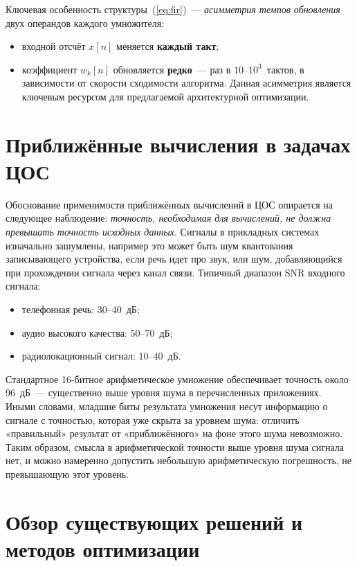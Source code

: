 \documentclass[a4paper, 12pt, oneside]{report}
\begin{document}
Ключевая особенность структуры~(\ref{eq:fir})~--- \textit{асимметрия
темпов обновления} двух операндов каждого умножителя:
\begin{itemize}
  \item входной отсчёт $x[n]$ меняется \textbf{каждый такт};
  \item коэффициент $w_k[n]$ обновляется \textbf{редко}~--- раз в
        $10$--$10^3$~тактов, в зависимости от скорости сходимости
        алгоритма. Данная асимметрия является ключевым ресурсом 
        для предлагаемой архитектурной оптимизации.
\end{itemize}


\section{Приближённые вычисления в задачах ЦОС}

Обоснование применимости приближённых вычислений в ЦОС опирается на
следующее наблюдение: \textit{точность, необходимая для вычислений, не
должна превышать точность исходных данных}. Сигналы в прикладных
системах изначально зашумлены, например это может быть шум квантования
записывающего устройства, если речь идет про звук, или шум, добавляющийся при 
прохождении сигнала через канал связи. Типичный диапазон SNR входного сигнала:

\begin{itemize}
  \item телефонная речь: 30--40~дБ;
  \item аудио высокого качества: 50--70~дБ;
  \item радиолокационный сигнал: 10--40~дБ.
\end{itemize}

Стандартное 16-битное арифметическое умножение обеспечивает точность
около 96~дБ~--- существенно выше уровня шума в перечисленных
приложениях. Иными словами, младшие биты результата умножения несут
информацию о сигнале с точностью, которая уже скрыта за уровнем
шума: отличить «правильный» результат от «приближённого» на фоне
этого шума невозможно. Таким образом, смысла в арифметической
точности выше уровня шума сигнала нет, и можно намеренно допустить
небольшую арифметическую погрешность, не  превышающую этот уровень.

\section{Обзор существующих решений и методов оптимизации}
\end{document}
